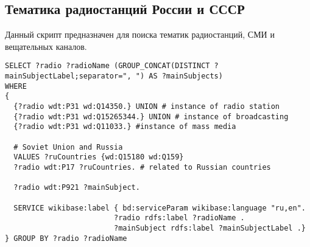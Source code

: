 
\newpage

\subsection{Тематика радиостанций России и СССР}

Данный скрипт предназначен для поиска тематик радиостанций, СМИ и вещательных каналов.

\begin{lstlisting}
SELECT ?radio ?radioName (GROUP_CONCAT(DISTINCT ?mainSubjectLabel;separator=", ") AS ?mainSubjects) 
WHERE
{
  {?radio wdt:P31 wd:Q14350.} UNION # instance of radio station
  {?radio wdt:P31 wd:Q15265344.} UNION # instance of broadcasting
  {?radio wdt:P31 wd:Q11033.} #instance of mass media
  
  # Soviet Union and Russia
  VALUES ?ruCountries {wd:Q15180 wd:Q159}
  ?radio wdt:P17 ?ruCountries. # related to Russian countries
  
  ?radio wdt:P921 ?mainSubject.
  
  SERVICE wikibase:label { bd:serviceParam wikibase:language "ru,en".
                         ?radio rdfs:label ?radioName .
                         ?mainSubject rdfs:label ?mainSubjectLabel .}
} GROUP BY ?radio ?radioName\end{lstlisting}%


\newpage

